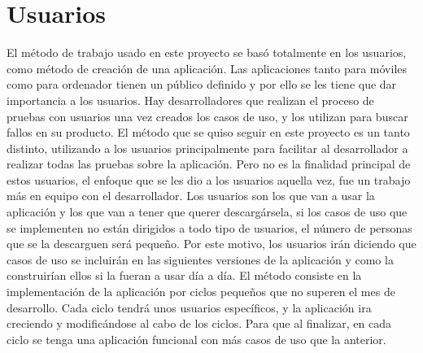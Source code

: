 \chapter{Usuarios}
\label{ch:Usuarios}



El método de trabajo usado en este proyecto se basó totalmente en los usuarios, como método de creación de una aplicación. Las aplicaciones tanto para móviles como para ordenador tienen un público definido y por ello se les tiene que dar importancia a los usuarios.
Hay desarrolladores que realizan el proceso de pruebas con usuarios una vez creados los casos de uso, y los utilizan para buscar fallos en su producto. El método que se quiso seguir en este proyecto  es un tanto distinto, utilizando a los usuarios principalmente para facilitar al desarrollador a realizar todas las pruebas sobre la aplicación. Pero no es la finalidad principal de estos usuarios, el enfoque que se les dio a los usuarios aquella vez, fue un trabajo más en equipo con el desarrollador.
Los usuarios son los que van a usar la aplicación y los que van a tener que querer descargársela, si los casos de uso que se implementen no están dirigidos a todo tipo de usuarios, el número de personas que se la descarguen será pequeño.
Por este motivo, los usuarios irán diciendo que casos de uso se incluirán en las siguientes versiones de la aplicación y como la construirían ellos si la fueran a usar día a día.
El método consiste en la implementación de la aplicación por ciclos pequeños que no superen el mes de desarrollo.
Cada ciclo tendrá unos usuarios específicos, y la aplicación ira creciendo y modificándose al cabo de los ciclos. Para que al finalizar, en cada ciclo se tenga una aplicación funcional con más casos de uso que la anterior.

